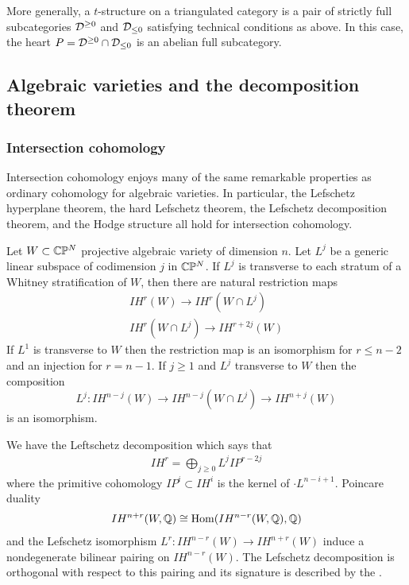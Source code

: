 \documentclass[12pt]{article}
\begin{document}
\begin{remark}
    More generally, a $t$-structure on a 
    triangulated category is a pair of strictly full subcategories ${\mathcal{D}}^{\geq 0}$
    and ${\mathcal{D}}_{\leq 0}$ satisfying technical
    conditions as above. In this case, the heart $P = {\mathcal{D}}^{\geq 0}\cap {\mathcal{D}}_{\leq 0}$ 
    is an abelian full subcategory.
\end{remark}

\subsection{Algebraic varieties and the decomposition theorem}
\subsubsection{Intersection cohomology}
Intersection cohomology enjoys many of the same remarkable properties as ordinary
cohomology for algebraic varieties. In particular, the Lefschetz hyperplane theorem,
the hard Lefschetz theorem, the Lefschetz decomposition theorem, and the 
Hodge structure all hold for intersection cohomology.

\begin{theorem}
    Let $W\subset \mathbb{C}\mathbb{P}^N$ projective algebraic variety of dimension $n$. 
    Let $L^j$ be a generic linear subspace of codimension $j$ in $\mathbb{C}\mathbb{P}^N$.
    If $L^j$ is transverse to each stratum of a Whitney stratification of $W$,
    then there are natural restriction maps \begin{align*}
        IH^r(W) \to IH^r(W\cap L^j) \\
        IH^r(W\cap L^j) \to IH^{r+2j}(W)
    \end{align*} If $L^1$ is transverse to $W$ then 
    the restriction map is an isomorphism for $r\leq n-2$ and an injection for $r = n-1$.
    If $j\geq 1$ and $L^j$ transverse to $W$ then the composition 
    \[L^j:IH^{n-j}(W) \to IH^{n-j}(W\cap L^j) \to IH^{n+j}(W)\] is an isomorphism.
\end{theorem}

\begin{theorem}
    We have the Leftschetz decomposition which says that \begin{align*}
        IH^r = \bigoplus_{j\geq 0} L^jIP^{r-2j}
    \end{align*} where the primitive cohomology 
    $IP^i\subset IH^i$ is the kernel of $\cdot L^{n-i+1}$. Poincare duality \begin{align*}
        IH^{n+r}(W,\mathbb{Q}) \cong \operatorname{Hom}(IH^{n-r}(W,\mathbb{Q}),\mathbb{Q})
    \end{align*} and the Lefschetz isomorphism $L^r: IH^{n-r}(W) \to IH^{n+r}(W)$ 
    induce a nondegenerate bilinear pairing on $IH^{n-r}(W)$. The Lefschetz decomposition is orthogonal 
    with respect to this pairing and its signature is described by the 
    .
\end{theorem}
\end{document}
